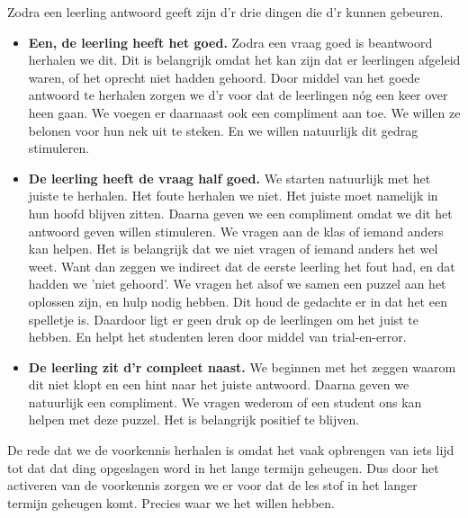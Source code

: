                     Zodra een leerling antwoord geeft zijn d'r drie dingen die d'r kunnen gebeuren.
                    \begin{itemize}
                        \item{\textbf{Een, de leerling heeft het goed.}
                            Zodra een vraag goed is beantwoord herhalen we dit. Dit is belangrijk omdat het kan zijn dat er leerlingen afgeleid waren, of het oprecht niet hadden gehoord. Door middel van het goede antwoord te herhalen zorgen we d'r voor dat de leerlingen nóg een keer over heen gaan. We voegen er daarnaast ook een compliment aan toe. We willen ze belonen voor hun nek uit te steken. En we willen natuurlijk dit gedrag stimuleren. 
                        }
                        \item{\textbf{De leerling heeft de vraag half goed.}
                            We starten natuurlijk met het juiste te herhalen. Het foute herhalen we niet. Het juiste moet namelijk in hun hoofd blijven zitten. Daarna geven we een compliment omdat we dit het antwoord geven willen stimuleren. We vragen aan de klas of iemand anders kan helpen. Het is belangrijk dat we niet vragen of iemand anders het wel weet. Want dan zeggen we indirect dat de eerste leerling het fout had, en dat hadden we 'niet gehoord'. We vragen het alsof we samen een puzzel aan het oplossen zijn, en hulp nodig hebben. Dit houd de gedachte er in dat het een spelletje is. Daardoor ligt er geen druk op de leerlingen om het juist te hebben.\cite{games-help} En helpt het studenten leren door middel van trial-en-error.\cite{games-help}
                        }
                        \item{\textbf{De leerling zit d'r compleet naast.}
                            We beginnen met het zeggen waarom dit niet klopt en een hint naar het juiste antwoord. Daarna geven we natuurlijk een compliment. We vragen wederom of een student ons kan helpen met deze puzzel. Het is belangrijk positief te blijven.
                        }
                    \end{itemize}

                    \bigskip

                    \noindent De rede dat we de voorkennis herhalen is omdat het vaak opbrengen van iets lijd tot dat dat ding opgeslagen word in het lange termijn geheugen.\cite{repeating-leads-to-long-term-memory} Dus door het activeren van de voorkennis zorgen we er voor dat de les stof in het langer termijn geheugen komt. Precies waar we het willen hebben.
                        
